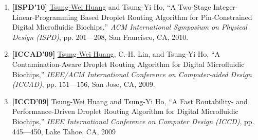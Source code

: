 \documentclass[A4,11pt]{article}
\begin{document}
\begin{enumerate}
    \item \textbf{[ISPD'10]} \underline{Tsung-Wei Huang} and Tsung-Yi Ho, ``A Two-Stage Integer-Linear-Programming Based Droplet Routing Algorithm for Pin-Constrained Digital Microfluidic Biochips,'' \textit{ACM International Symposium on Physical Design (ISPD)}, pp. 201—208, San Francisco, CA, 2010. 

    \item \textbf{[ICCAD'09]} \underline{Tsung-Wei Huang}, C.-H. Lin, and Tsung-Yi Ho, ``A Contamination-Aware Droplet Routing Algorithm for Digital Microfluidic Biochips,'' \textit{IEEE/ACM International Conference on Computer-aided Design (ICCAD)}, pp. 151—156, San Jose, CA, 2009. 

    \item \textbf{[ICCD'09]} \underline{Tsung-Wei Huang} and Tsung-Yi Ho, ``A Fast Routability- and Performance-Driven Droplet Routing Algorithm for Digital Microfluidic Biochips,'' \textit{IEEE International Conference on Computer Design (ICCD)}, pp. 445—450, Lake Tahoe, CA, 2009

 \end{enumerate}
\end{document}
